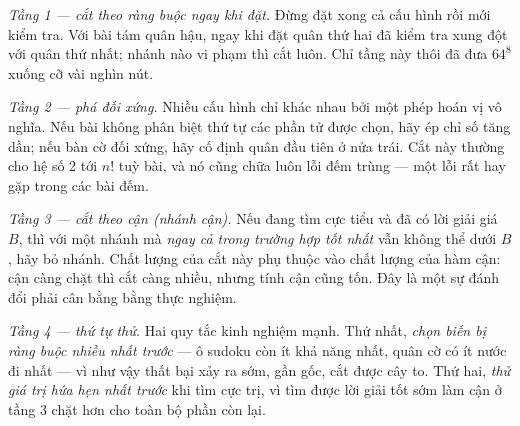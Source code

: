 \documentclass[../../algorithm.tex]{subfiles}
\begin{document}
\emph{Tầng 1 --- cắt theo ràng buộc ngay khi đặt.} Đừng đặt xong cả cấu hình rồi mới kiểm tra. Với bài tám quân hậu, ngay khi đặt quân thứ hai đã kiểm tra xung đột với quân thứ nhất; nhánh nào vi phạm thì cắt luôn. Chỉ tầng này thôi đã đưa \(64^8\) xuống cỡ vài nghìn nút.

\emph{Tầng 2 --- phá đối xứng.} Nhiều cấu hình chỉ khác nhau bởi một phép hoán vị vô nghĩa. Nếu bài không phân biệt thứ tự các phần tử được chọn, hãy ép chỉ số tăng dần; nếu bàn cờ đối xứng, hãy cố định quân đầu tiên ở nửa trái. Cắt này thường cho hệ số 2 tới \(n!\) tuỳ bài, và nó cũng chữa luôn lỗi đếm trùng --- một lỗi rất hay gặp trong các bài đếm.

\emph{Tầng 3 --- cắt theo cận (nhánh cận).} Nếu đang tìm cực tiểu và đã có lời giải giá \(B\), thì với một nhánh mà \emph{ngay cả trong trường hợp tốt nhất} vẫn không thể dưới \(B\), hãy bỏ nhánh. Chất lượng của cắt này phụ thuộc vào chất lượng của hàm cận: cận càng chặt thì cắt càng nhiều, nhưng tính cận cũng tốn. Đây là một sự đánh đổi phải cân bằng bằng thực nghiệm.

\emph{Tầng 4 --- thứ tự thử.} Hai quy tắc kinh nghiệm mạnh. Thứ nhất, \emph{chọn biến bị ràng buộc nhiều nhất trước} --- ô sudoku còn ít khả năng nhất, quân cờ có ít nước đi nhất --- vì như vậy thất bại xảy ra sớm, gần gốc, cắt được cây to. Thứ hai, \emph{thử giá trị hứa hẹn nhất trước} khi tìm cực trị, vì tìm được lời giải tốt sớm làm cận ở tầng 3 chặt hơn cho toàn bộ phần còn lại.
\end{document}
